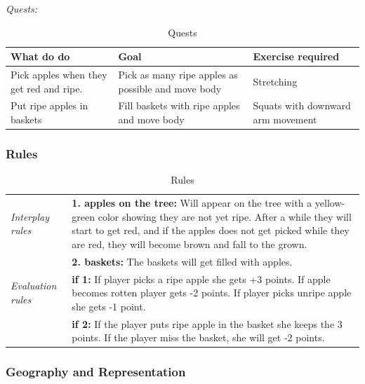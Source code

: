 \emph{Quests:} 

\begin{table}
\begin{tabular}{|>{\raggedright}p{}|>{\raggedright}p{4cm}|p{}|}
\hline
\textbf{What do do} & \textbf{Goal} & \textbf{Exercise required}  \\ \hline
Pick apples when they get red and ripe. & Pick as many ripe apples as possible and move body & Stretching  \\ \hline
Put ripe apples in baskets & Fill baskets with ripe apples and move body &  Squats with downward arm movement \\ \hline
\end{tabular}
\caption[Quests in the "Apple Picking" game]{Quests}
\label{tab:quests2}
\end{table}

\subsubsection{Rules} 

\begin{table} [H]
\centering
\begin{tabular}{|p{}|p{}|}
\hline
\emph{Interplay rules} &  \textbf{1. apples on the tree:} Will appear on the tree with a yellow-green color showing they are not yet ripe. After a while they will start to get red, and if the apples does not get picked while they are red, they will become brown and fall to the grown. \\ \cline{2-2}
& \textbf{2. baskets:} The baskets will get filled with apples. \\ \hline
\emph{Evaluation rules} & \textbf{if 1:} If player picks a ripe apple she gets +3 points. If apple becomes rotten player gets  -2 points. If player picks unripe apple she gets -1 point. \\ \cline{2-2}
& \textbf{if 2:} If the player puts ripe apple in the basket she keeps the 3 points. If the player miss the basket, she will get -2 points.  \\ \hline
\end{tabular}
\caption[Rules for the "Apple Picking" game]{Rules}
\label{tab:rules2}
\end{table}  

\subsubsection{Geography and Representation}

